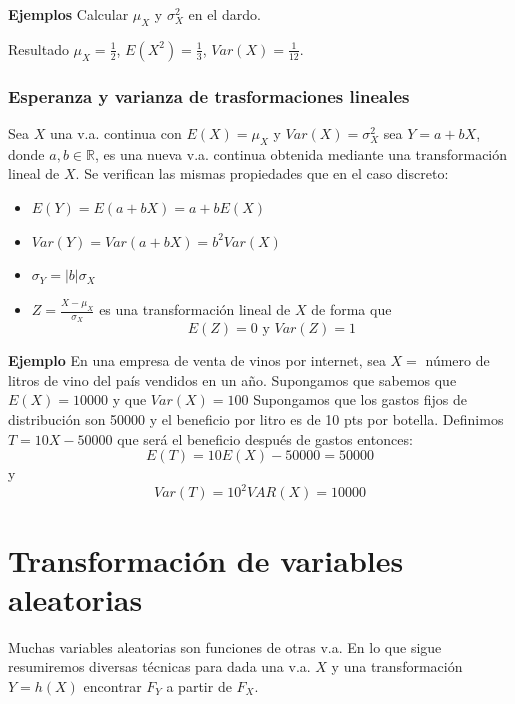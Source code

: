 \documentclass[handout]{beamer}\usepackage[]{graphicx}\usepackage[]{color}
\newcommand{\RR}{\mathbb{R}}
\theoremstyle{plain}
\theoremstyle{definition}
\begin{document}
\begin{frame}

\textbf{Ejemplos} Calcular $\mu_{X}$ y $\sigma_{X}^{2}$ en el dardo.

Resultado $\mu_{X}=\frac{1}{2}$, $E(X^2)=\frac{1}{3}$,
$Var(X)=\frac{1}{12}$.
\end{frame}
\subsubsection{Esperanza y varianza de trasformaciones lineales}


\begin{frame}
Sea $X$ una v.a. continua con $E(X)=\mu_{X}$ y $Var(X)=\sigma_{X}^{2}$ sea $Y=a+b X$, donde
$a,b\in\RR$, es una nueva v.a. continua obtenida mediante una transformación lineal de $X$.
Se verifican las mismas propiedades que en el caso discreto:
\begin{itemize}
\item  $E(Y)=E(a+b X)=a+b E(X)$
\item $Var(Y)=Var(a+b X)=b^{2} Var(X)$
\item $\sigma_{Y}=|b| \sigma_{X}$
\item $Z=\frac{X-\mu_{X}}{\sigma_{X}}$ es una transformación
lineal de $X$ de forma que
$$E(Z)=0 \mbox{ y } Var(Z)=1$$
\end{itemize}
\end{frame}

\begin{frame}

\textbf{Ejemplo}
En una empresa de venta de vinos por internet, sea
$X=$ número de  litros de vino del país vendidos en un año.
Supongamos que sabemos que $E(X)=10000$ y que $Var(X)=100$
Supongamos que los gastos fijos de distribución son
50000 y el beneficio por litro es de 10 pts por botella.
Definimos $T=10 X-50000$ que será el beneficio después de gastos
entonces:
$$E(T)=10 E(X)-50000 = 50000$$
y
$$Var(T)=10^2 VAR(X)= 10000$$

\end{frame}
\section{Transformación de variables aleatorias}
\begin{frame}


Muchas variables aleatorias son funciones de otras v.a. En lo que
sigue resumiremos diversas técnicas para dada una v.a. $X$ y una
transformación $Y=h(X)$  encontrar $F_{Y}$ a
partir de $F_{X}$.

\end{frame}
\end{document}
